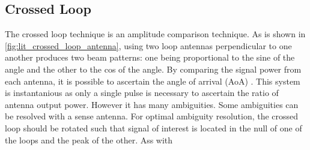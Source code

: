 \subsection{Crossed Loop}
The crossed loop technique is an amplitude comparison technique. As is shown in \autoref{fig:lit_crossed_loop_antenna}, using two loop antennas perpendicular to one another produces two beam patterns: one being proportional to the sine of the angle and the other to the cos of the angle. By comparing the signal power from each antenna, it is possible to ascertain the angle of arrival (AoA) . This system is instantanious as only a single pulse is necessary to ascertain the ratio of antenna output power. However it has many ambiguities. Some ambiguities can be resolved with a sense antenna. For optimal ambiguity resolution, the crossed loop should be rotated such that signal of interest is located in the null of one of the loops and the peak of the other. Ass with
